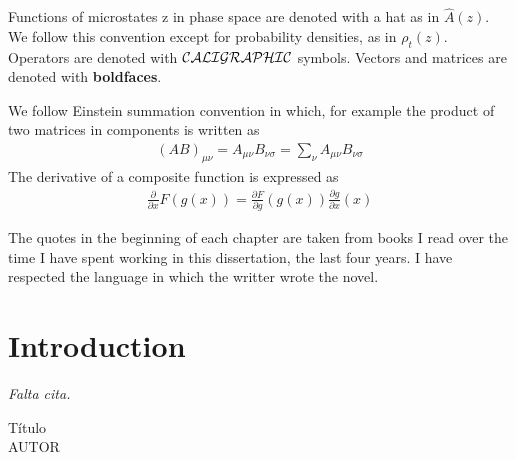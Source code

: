\documentclass[b5paper,openright,11pt]{book}
\begin{document}
Functions of microstates z in phase space are denoted with a hat as in $\hat{A}(z)$. We follow this convention except for probability densities, as in $\rho_t(z)$. Operators are denoted with ${\cal CALIGRAPHIC}$ symbols. Vectors and matrices are denoted with {\bf boldfaces}.


We follow Einstein summation convention in which, for example the product of two matrices in components is written as
\begin{align}
    (AB)_{\mu\nu} = A_{\mu\nu}B_{\nu\sigma}=\sum_{\nu}A_{\mu\nu}B_{\nu\sigma} \nonumber
\end{align}
The derivative of a composite function is expressed as
\begin{align}
    \frac{\partial}{\partial x}F(g(x))=\frac{\partial F}{\partial g}(g(x))\frac{\partial g}{\partial x}(x) \nonumber
\end{align}

The quotes in the beginning of each chapter are taken from books I read over the time I have spent working in this dissertation, the last four years. I have respected the language in which the writter wrote the novel.



\setcounter{chapter}{-1}
\chapter{Introduction}\label{Chap:Intro}
\pagestyle{chapters}  %
\epigraph{\textit{Falta cita.}}{Título \\ AUTOR}
\end{document}
